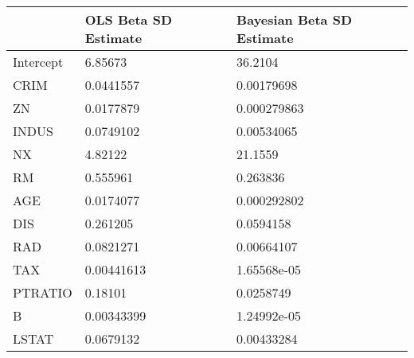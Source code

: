 \begin{tabular}{lll}
\hline
           & OLS Beta SD Estimate   & Bayesian Beta SD Estimate   \\
\hline
 Intercept & 6.85673                & 36.2104                     \\
 CRIM      & 0.0441557              & 0.00179698                  \\
 ZN        & 0.0177879              & 0.000279863                 \\
 INDUS     & 0.0749102              & 0.00534065                  \\
 NX        & 4.82122                & 21.1559                     \\
 RM        & 0.555961               & 0.263836                    \\
 AGE       & 0.0174077              & 0.000292802                 \\
 DIS       & 0.261205               & 0.0594158                   \\
 RAD       & 0.0821271              & 0.00664107                  \\
 TAX       & 0.00441613             & 1.65568e-05                 \\
 PTRATIO   & 0.18101                & 0.0258749                   \\
 B         & 0.00343399             & 1.24992e-05                 \\
 LSTAT     & 0.0679132              & 0.00433284                  \\
\hline
\end{tabular}